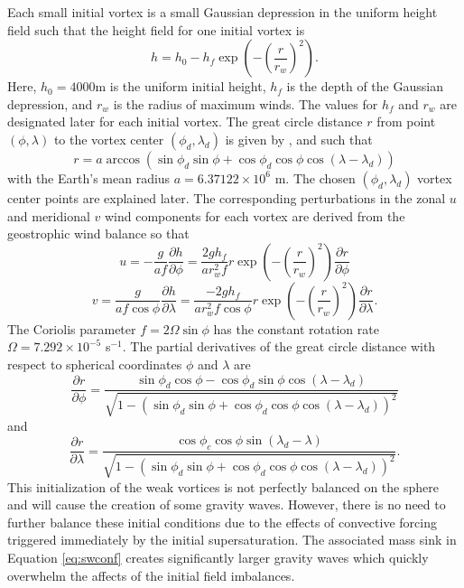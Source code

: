   Each small initial vortex is a small Gaussian depression
  in the uniform height field such that the height field for one initial vortex is
  \begin{equation}
    \label{eq:hforce} h = h_0 - h_{f} \exp{\left(-\left(\frac{r}
    {r_w}\right)^2\right)}.
  \end{equation}
 Here, $h_0 = 4000 \mathrm{ m}$ is the uniform initial height, $h_f$ is the depth 
 of the Gaussian depression, and $r_w$ 
 is the radius of maximum winds. The values for $h_f$ and $r_w$ are designated later for each initial vortex.
 The great circle distance $r$ from
 point $(\phi, \lambda)$ to the vortex center $(\phi_d, \lambda_d)$ is given by ,  and  such that
  \begin{equation}
    \label{eq:gcd} r = a \arccos \left(\sin\phi_d \sin\phi + \cos\phi_d
    \cos\phi \cos\left(\lambda - \lambda_d\right)\right)
  \end{equation}
  with the Earth's mean radius $a = 6.37122 \times 10^6$ m.  The
  chosen $(\phi_d, \lambda_d)$ vortex center points are explained later.
  The corresponding perturbations in the zonal $u$ and meridional $v$ wind  
  components for each vortex are derived from the geostrophic 
  wind balance so that
  \begin{equation}
     \label{eq:uforce} u = -\frac{g}{af}\frac{\partial h}{\partial \phi} 
     = \frac{2 g h_f}{a r_w^2 f} r \exp{\left(-\left(\frac{r}{r_w}\right)^2\right)}
     \frac{\partial r}{\partial \phi}
   \end{equation}
  \begin{equation}
     \label{eq:vforce} v = \frac{g}{af\cos\phi}\frac{\partial h}{\partial \lambda}
     = \frac{-2 g h_f}{a r_w^2 f \cos\phi} r \exp{\left(-\left(\frac{r}{r_w}\right)^2\right)}
     \frac{\partial r}{\partial \lambda}.
   \end{equation}
  The Coriolis parameter $f = 2 \Omega \sin \phi$ has the constant rotation rate
  $\Omega = 7.292 \times 10^{-5}$ s$^{-1}$. The partial derivatives of the great circle 
  distance with respect to spherical coordinates $\phi$ and $\lambda$ are
  \begin{equation} 
  	 \frac{\partial r}{\partial \phi} = \frac{\sin\phi_d\cos\phi - \cos\phi_d\sin\phi\cos\left(\lambda - \lambda_d\right)}
	 {\sqrt{1 - \left(\sin\phi_d \sin\phi + \cos\phi_d\cos\phi\cos\left(\lambda-\lambda_d\right)\right)^2}}
  \end{equation}
  and
  \begin{equation}
  	\frac{\partial r}{\partial \lambda} = \frac{\cos\phi_c\cos\phi\sin\left(\lambda_d - \lambda\right)}
	{\sqrt{1 - \left(\sin\phi_d \sin\phi + \cos\phi_d\cos\phi\cos\left(\lambda-\lambda_d\right)\right)^2}}.
  \end{equation}
  This initialization of the weak vortices is not perfectly balanced on the sphere and 
  will cause the creation of some gravity waves. However, there is no need to further balance
  these initial conditions due to the effects of convective forcing 
  triggered immediately by the initial supersaturation.
  The associated mass sink in Equation \ref{eq:swconf} creates significantly larger gravity waves
   which quickly overwhelm the affects of the initial field imbalances. 
  
